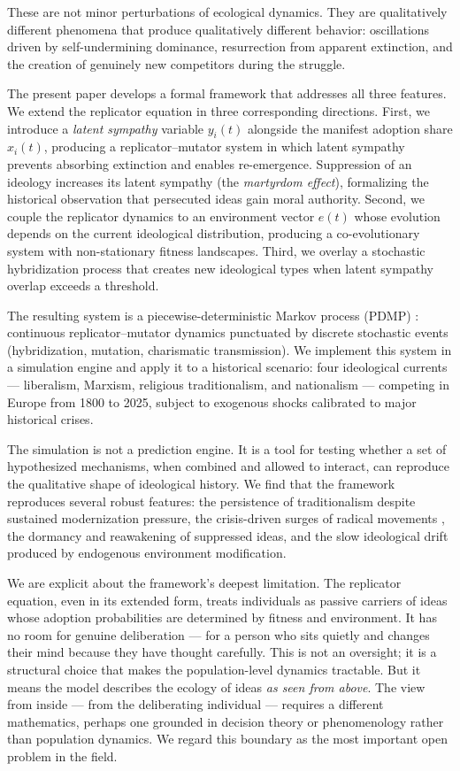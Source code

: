 These are not minor perturbations of ecological dynamics. They are
qualitatively different phenomena that produce qualitatively different
behavior: oscillations driven by self-undermining dominance, resurrection
from apparent extinction, and the creation of genuinely new competitors
during the struggle.

The present paper develops a formal framework that addresses all three
features. We extend the replicator equation
\citep{taylor1978evolutionary} in three corresponding directions.
First, we introduce a \emph{latent sympathy} variable $y_i(t)$ alongside the
manifest adoption share $x_i(t)$, producing a replicator--mutator system
\citep{komarova2004replicator,page2002unifying} in which latent sympathy
prevents absorbing extinction and enables re-emergence. Suppression of an
ideology increases its latent sympathy (the \emph{martyrdom effect}),
formalizing the historical observation that persecuted ideas gain moral
authority. Second, we couple the replicator dynamics to an environment vector
$e(t)$ whose evolution depends on the current ideological distribution,
producing a co-evolutionary system with non-stationary fitness landscapes.
Third, we overlay a stochastic hybridization process that creates new
ideological types when latent sympathy overlap exceeds a threshold.

The resulting system is a piecewise-deterministic Markov process (PDMP)
\citep{davis1995piecewise}: continuous replicator--mutator dynamics
punctuated by discrete stochastic events (hybridization, mutation, charismatic
transmission). We implement this system in a simulation engine and apply it
to a historical scenario: four ideological currents --- liberalism, Marxism,
religious traditionalism, and nationalism --- competing in Europe from 1800 to
2025, subject to exogenous shocks calibrated to major historical crises.

The simulation is not a prediction engine. It is a tool for testing whether a
set of hypothesized mechanisms, when combined and allowed to interact, can
reproduce the qualitative shape of ideological history. We find that the
framework reproduces several robust features: the persistence of
traditionalism despite sustained modernization pressure, the crisis-driven
surges of radical movements \citep{funke2016going}, the dormancy and
reawakening of suppressed ideas, and the slow ideological drift produced by
endogenous environment modification.

We are explicit about the framework's deepest limitation. The replicator
equation, even in its extended form, treats individuals as passive carriers
of ideas whose adoption probabilities are determined by fitness and
environment. It has no room for genuine deliberation --- for a person who
sits quietly and changes their mind because they have thought carefully.
This is not an oversight; it is a structural choice that makes the population-level
dynamics tractable. But it means the model describes the ecology of ideas
\emph{as seen from above}. The view from inside --- from the deliberating
individual --- requires a different mathematics, perhaps one grounded in
decision theory or phenomenology rather than population dynamics. We regard
this boundary as the most important open problem in the field.

